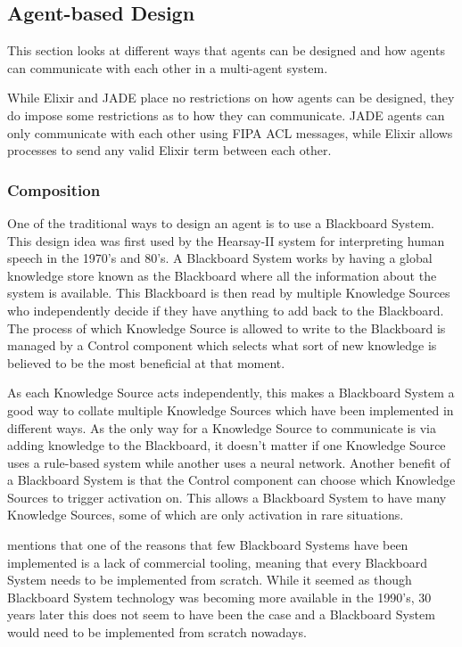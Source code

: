 \subsection{Agent-based Design}

This section looks at different ways that agents can be designed and how agents can communicate with each other in a multi-agent system.

While Elixir and JADE place no restrictions on how agents can be designed, they do impose some restrictions as to how they can communicate.
JADE agents can only communicate with each other using FIPA ACL messages, while Elixir allows processes to send any valid Elixir term between each other.

\subsubsection{Composition}

One of the traditional ways to design an agent is to use a Blackboard System.
This design idea was first used by the Hearsay-II system for interpreting human speech in the 1970's and 80's.
A Blackboard System works by having a global knowledge store known as the Blackboard where all the information about the system is available.
This Blackboard is then read by multiple Knowledge Sources who independently decide if they have anything to add back to the Blackboard.
The process of which Knowledge Source is allowed to write to the Blackboard is managed by a Control component which selects what sort of new knowledge is believed to be the most beneficial at that moment.~\cite{nii1986blackboard}

As each Knowledge Source acts independently, this makes a Blackboard System a good way to collate multiple Knowledge Sources which have been implemented in different ways.
As the only way for a Knowledge Source to communicate is via adding knowledge to the Blackboard, it doesn't matter if one Knowledge Source uses a rule-based system while another uses a neural network.
Another benefit of a Blackboard System is that the Control component can choose which Knowledge Sources to trigger activation on.
This allows a Blackboard System to have many Knowledge Sources, some of which are only activation in rare situations.~\cite{corkill1991blackboard}

 mentions that one of the reasons that few Blackboard Systems have been implemented is a lack of commercial tooling, meaning that every Blackboard System needs to be implemented from scratch.
While it seemed as though Blackboard System technology was becoming more available in the 1990's, 30 years later this does not seem to have been the case and a Blackboard System would need to be implemented from scratch nowadays.

